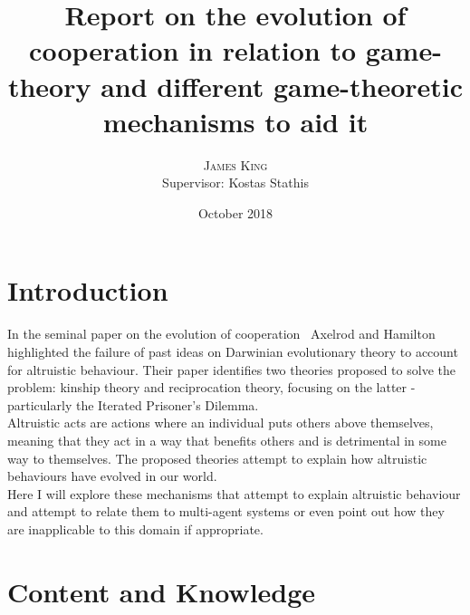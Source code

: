 \documentclass[twoside,twocolumn]{article}
\title{Report on the evolution of cooperation in relation to game-theory and different game-theoretic mechanisms to aid it} %
\author{%
\textsc{James King} \\%
\normalsize Supervisor: Kostas Stathis \\ %
}
\date{October 2018} %
\begin{document}


\maketitle


\section{Introduction}
In the seminal paper on the evolution of cooperation~\cite{evolution_of_cooperation} Axelrod and Hamilton highlighted the failure of past ideas on Darwinian evolutionary theory to account for altruistic behaviour. Their paper identifies two theories proposed to solve the problem: kinship theory and reciprocation theory, focusing on the latter - particularly the Iterated Prisoner's Dilemma.\\ 
Altruistic acts are actions where an individual puts others above themselves, meaning that they act in a way that benefits others and is detrimental in some way to themselves. The proposed theories attempt to explain how altruistic behaviours have evolved in our world.\\
Here I will explore these mechanisms that attempt to explain altruistic behaviour and attempt to relate them to multi-agent systems or even point out how they are inapplicable to this domain if appropriate.\\


\section{Content and Knowledge}
\end{document}
